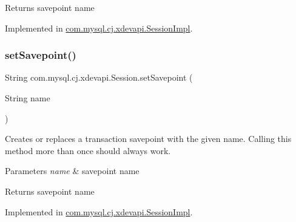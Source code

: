 \begin{DoxyReturn}{Returns}
savepoint name 
\end{DoxyReturn}


Implemented in \mbox{\hyperlink{classcom_1_1mysql_1_1cj_1_1xdevapi_1_1_session_impl_a3eb7fd3b8ff1e2fc436fc271f1129fae}{com.\+mysql.\+cj.\+xdevapi.\+Session\+Impl}}.

\mbox{\label{interfacecom_1_1mysql_1_1cj_1_1xdevapi_1_1_session_a0729993f853b93bd8c819194aaa5f258}} 
\subsubsection{\texorpdfstring{set\+Savepoint()}{setSavepoint()}\hspace{0.1cm}{\footnotesize\ttfamily [2/2]}}
{\footnotesize\ttfamily String com.\+mysql.\+cj.\+xdevapi.\+Session.\+set\+Savepoint (\begin{DoxyParamCaption}\item[{String}]{name }\end{DoxyParamCaption})}

Creates or replaces a transaction savepoint with the given name. Calling this method more than once should always work.


\begin{DoxyParams}{Parameters}
{\em name} & savepoint name \\
\hline
\end{DoxyParams}
\begin{DoxyReturn}{Returns}
savepoint name 
\end{DoxyReturn}


Implemented in \mbox{\hyperlink{classcom_1_1mysql_1_1cj_1_1xdevapi_1_1_session_impl_a4425c6c14d6b1159a23c0ede2b2e120d}{com.\+mysql.\+cj.\+xdevapi.\+Session\+Impl}}.

\mbox{\label{interfacecom_1_1mysql_1_1cj_1_1xdevapi_1_1_session_a4409e5c0f5917851f9875342b8d38b18}} 
